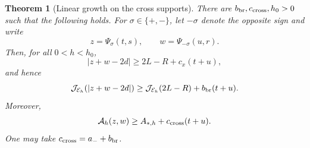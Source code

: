 \documentclass[11pt]{article}
\newtheorem{theorem}{Theorem}[section]
\newcommand{\cA}{\mathcal A}
\newcommand{\cE}{\mathcal E}
\newcommand{\cJ}{\mathcal J}
\begin{document}
\begin{theorem}[Linear growth on the cross supports]
\label{lem:cross-support-growth}
There are $b_{\rm br},c_{\rm cross},h_0>0$ such that the following holds.
For $\sigma\in\{+,-\}$, let $-\sigma$ denote the opposite sign and write
\[
 z=\Psi_\sigma(t,s),\qquad w=\Psi_{-\sigma}(u,r).
\]
Then, for all $0<h<h_0$,
\begin{equation}\label{eq:cross-bridge-distance-growth}
 |z+w-2d|\ge 2L-R+c_x(t+u),
\end{equation}
and hence
\begin{equation}\label{eq:bridge-linear-response}
 \cJ_{\cE_h}(|z+w-2d|)
 \ge \cJ_{\cE_h}(2L-R)+b_{\rm br}(t+u).
\end{equation}
Moreover,
\begin{equation}\label{eq:cross-action-growth}
 \cA_h(z,w)
 \ge A_{*,h}+c_{\rm cross}(t+u).
\end{equation}
One may take $c_{\rm cross}=a_-+b_{\rm br}$.
\end{theorem}
\end{document}
